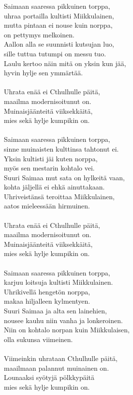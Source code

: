 
Saimaan saaressa pikkuinen torppa,\\
uhraa portailla kultisti Miikkulainen,\\
mutta pintaan ei nouse kuin norppa,\\
on pettymys melkoinen.\\
Aallon alla se suunnisti kutsujan luo,\\
sille tuttua tutumpi on messu tuo.\\
Laulu kertoo näin mitä on yksin kun jää,\\
hyvin hylje sen ymmärtää.\\
\hspace{10mm} \\
Uhrata enää ei Cthulhulle päitä,\\
maailma modernisoitunut on.\\
Muinaisjäänteitä viiksekkäitä,\\
mies sekä hylje kumpikin on.\\
\hspace{10mm} \\
Saimaan saaressa pikkuinen torppa,\\
sinne muinaisten kulttinsa tahtonut ei.\\
Yksin kultisti jäi kuten norppa,\\
myös sen mestarin kohtalo vei.\\
Suuri Saimaa mut sata on hylkeitä vaan,\\
kohta jäljellä ei ehkä ainuttakaan.\\
Uhriveistänsä teroittaa Miikkulainen,\\
aatos mieleessään hirmuinen.\\
\hspace{10mm} \\
Uhrata enää ei Cthulhulle päitä,\\
maailma modernisoitunut on.\\
Muinaisjäänteitä viiksekkäitä,\\
mies sekä hylje kumpikin on.\\
\hspace{10mm} \\
Saimaan saaressa pikkuinen torppa,\\
karjuu loitsuja kultisti Miikkulainen.\\
Uhrikivellä hengetön norppa,\\
makaa hiljalleen kylmentyen.\\
Suuri Saimaa ja alta sen lainehien,\\
nousee kauhu niin vanha ja lonkeroinen.\\
Niin on kohtalo norpan kuin Miikkulaisen,\\
olla sukunsa viimeinen.\\
\hspace{10mm} \\
Viimeinkin uhrataan Cthulhulle päitä,\\
maailmaan palannut muinainen on.\\
Lounaaksi syötyjä pölkkypäitä\\
mies sekä hylje kumpikin on.\\